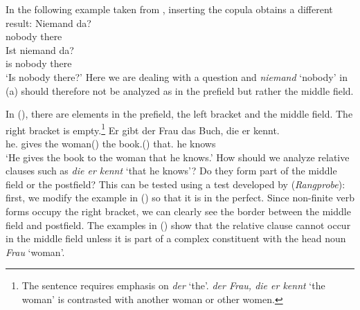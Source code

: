 In the following example taken from \citet[]{Paul1919a}, inserting the copula obtains a different result: 
\eal
\ex 
\gll Niemand da?\\
	 nobody there\\
\ex 
\gll Ist niemand da?\\
	 is nobody there\\
\glt `Is nobody there?'
\zl
Here we are dealing with a question and \emph{niemand} `nobody' in (a) should therefore not be analyzed as in the prefield but rather the middle field.

In (), there are elements in the prefield, the left bracket and the middle field. The right
bracket is empty.\footnote{%
  The sentence requires emphasis on \emph{der} `the'. \emph{der Frau, die er kennt} `the woman' is
  contrasted with another woman or other women.
}
\ea
\gll Er        gibt  der Frau        das Buch,       die er kennt.\\
     he.\mas{} gives the woman(\fem) the book.(\neu) that.\fem{} he knows\\
\glt `He gives the book to the woman that he knows.'
\z 
How should we analyze relative clauses such as
\emph{die er kennt} `that he knows'? Do they form part of the middle field or the postfield?
This can be tested using a test developed by \citet[]{Bech55a} (\emph{Rangprobe}):
first, we modify the example in () so that it is in the perfect. Since non-finite verb forms occupy the right bracket, we
can clearly see the border between the middle field and postfield. The examples in () show that the relative clause cannot
occur in the middle field unless it is part of a complex constituent with the head noun \emph{Frau} `woman'.
\eal
{}
\zl

